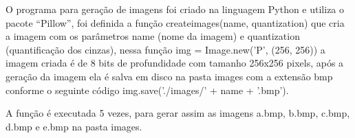 \documentclass[10pt,a4paper]{article}
\begin{document}
\begin{flushleft}
O programa para geração de imagens foi criado na linguagem Python e utiliza o pacote “Pillow”, foi definida a função {\ttfamily create\textunderscore images(name, quantization)} que cria a imagem com os parâmetros name (nome da imagem) e quantization (quantificação dos cinzas), nessa função {\ttfamily img = Image.new('P', (256, 256))} a imagem criada é de 8 bits de profundidade com tamanho 256x256 pixels, após a geração da imagem ela é salva em disco na pasta images com a extensão bmp conforme o seguinte código  {\ttfamily  img.save('./images/' + name + '.bmp')}.
\end{flushleft}

\begin{flushleft}
A função é executada 5 vezes, para gerar assim as imagens a.bmp, b.bmp, c.bmp, d.bmp e e.bmp na pasta images.  
\end{flushleft}

\begin{figure}[H]
    \centering
    \qquad
    \qquad
    \qquad
    \qquad
\end{figure}
\end{document}
